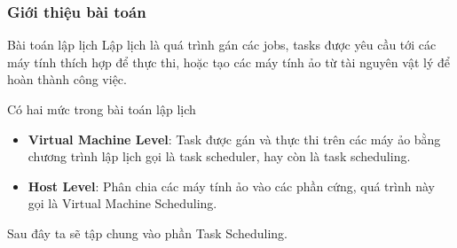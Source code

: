 \documentclass[11pt,xcolor={dvipsnames}, aspectratio=169]{beamer}
\begin{document}
\begin{frame}
\frametitle{Giới thiệu bài toán}

\begin{block}
{Bài toán lập lịch}
Lập lịch là quá trình gán các jobs, tasks được yêu cầu tới các máy tính thích hợp để thực thi, hoặc tạo các máy tính ảo từ tài nguyên vật lý để hoàn thành công việc. \\[1cm]
\end{block}

Có hai mức trong bài toán lập lịch 
\begin{itemize}
    \item \textbf{Virtual Machine Level}: Task được gán và thực thi trên các máy ảo bằng chương trình lập lịch gọi là task scheduler, hay còn là task scheduling.
    \item \textbf{Host Level}: Phân chia các máy tính ảo vào các phần cứng, quá trình này gọi là Virtual Machine Scheduling. 
\end{itemize}
\begin{block}
{Sau đây ta sẽ tập chung vào phần Task Scheduling.}
\end{block}
\end{frame}
\end{document}
